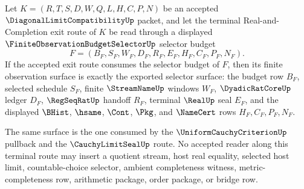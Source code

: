 \begin{theorem}
\label{thm:diagonal-limit-selector-budget-finite-observation-coverage}
Let $K=(R,T,S,D,W,Q,L,H,C,P,N)$ be an accepted $\DiagonalLimitCompatibilityUp$ packet, and let the terminal Real-and-Completion exit route of $K$ be read through a displayed $\FiniteObservationBudgetSelectorUp$ selector budget
$$
F=(B_F,S_F,W_F,D_F,R_F,E_F,H_F,C_F,P_F,N_F).
$$
If the accepted exit route consumes the selector budget of $F$, then its finite observation surface is exactly the exported selector surface: the budget row $B_F$, selected schedule $S_F$, finite $\StreamNameUp$ windows $W_F$, $\DyadicRatCoreUp$ ledger $D_F$, $\RegSeqRatUp$ handoff $R_F$, terminal $\RealUp$ seal $E_F$, and the displayed $\BHist$, $\hsame$, $\Cont$, $\Pkg$, and $\NameCert$ rows $H_F,C_F,P_F,N_F$.

The same surface is the one consumed by the $\UniformCauchyCriterionUp$ pullback and the $\CauchyLimitSealUp$ route. No accepted reader along this terminal route may insert a quotient stream, host real equality, selected host limit, countable-choice selector, ambient completeness witness, metric-completeness row, arithmetic package, order package, or bridge row.
\end{theorem}
